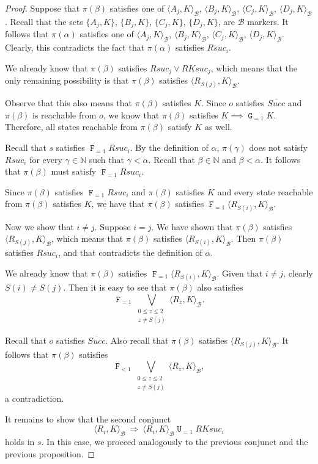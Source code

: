 \documentclass[a4paper,UKenglish,cleveref, autoref, thm-restate]{lipics-v2021}
\newcommand{\B}{\mathcal{B}}
\newcommand{\ex}[1]{\langle #1 \rangle}
\newcommand{\Succ}{\mathit{Succ}}
\newcommand{\RKSuc}{\textit{RKsuc}}
\newcommand*{\opu}{\operatorname{\pmb{\mathtt{U}}}}
\newcommand*{\opf}{\operatorname{\pmb{\mathtt{F}}}}
\newcommand*{\opg}{\operatorname{\pmb{\mathtt{G}}}}
\newcommand*{\nat}{\mathbb{N}}
\begin{document}
\begin{proof}
Suppose that $\pi(\beta)$ satisfies one of $\ex{A_j,K}_{\B}$,
$\ex{B_j,K}_{\B}$, $\ex{C_j,K}_{\B}$, $\ex{D_j,K}_{\B}$.
Recall that the sets $\{A_j,K\}$, $\{B_j,K\}$, $\{C_j,K\}$,
$\{D_j,K\}$, are $\B$ markers.
It follows that $\pi(\alpha)$ satisfies one of
$\ex{A_j,K}_{\B}$, $\ex{B_j,K}_{\B}$, $\ex{C_j,K}_{\B}$,
$\ex{D_j,K}_{\B}$.
Clearly, this contradicts the fact that $\pi(\alpha)$ satisfies
$Rsuc_i$.


We already know that $\pi(\beta)$ satisfies $Rsuc_j \vee RKsuc_j$,
which means that the only remaining possibility is that $\pi(\beta)$
satisfies $\ex{R_{S(j)},K}_\B$.

Observe that this also means that $\pi(\beta)$ satisfies $K$.
Since $o$ satisfies $\overline{\Succ}$ and $\pi(\beta)$ is
reachable from $o$, we know that $\pi(\beta)$ satisfies 
$K \implies \opg_{=1} K$.
Therefore, all states reachable from $\pi(\beta)$ satisfy $K$
as well.


Recall that $s$ satisfies $\opf_{=1} Rsuc_i$.
By the definition of $\alpha$, $\pi(\gamma)$ does not satisfy
$Rsuc_i$ for every $\gamma \in \nat$ such that $\gamma < \alpha$.
Recall that $\beta \in \nat$ and $\beta < \alpha$.
It follows that $\pi(\beta)$ must satisfy $\opf_{=1} Rsuc_i$.


Since $\pi(\beta)$ satisfies $\opf_{=1} Rsuc_i$
and $\pi(\beta)$ satisfies $K$
and every state reachable from $\pi(\beta)$ satisfies $K$,
we have that $\pi(\beta)$ satisfies $\opf_{=1} \ex{R_{S(i)},K}_{\B}$.


Now we show that $i \neq j$.
Suppose $i=j$.
We have shown that $\pi(\beta)$ satisfies $\ex{R_{S(j)},K}_\B$,
which means that $\pi(\beta)$ satisfies $\ex{R_{S(i)},K}_\B$.
Then $\pi(\beta)$ satisfies $Rsuc_i$, and that contradicts
the definition of $\alpha$.


We already know that $\pi(\beta)$ satisfies
$\opf_{=1} \ex{R_{S(i)},K}_{\B}$.
Given that $i \neq j$, clearly $S(i) \neq S(j)$.
Then it is easy to see that $\pi(\beta)$ also satisfies
\[
\opf_{=1} \bigvee_{\substack{0 \leq z \leq 2 \\ z \neq S(j)}} \ex{R_{z},K}_\B.
\]

Recall that $o$ satisfies $\overline{\Succ}$.
Also recall that $\pi(\beta)$ satisfies $\ex{R_{S(j)},K}_\B$.
It follows that $\pi(\beta)$ satisfies
\[
\opf_{<1} \bigvee_{\substack{0 \leq z \leq 2 \\ z \neq S(j)}} \ex{R_{z},K}_\B,
\]
a contradiction.

It remains to show that the second conjunct
\[
\ex{R_i,K}_{\B} \ \Rightarrow \ \ex{R_i,K}_{\B} \opu_{=1} \RKSuc_i
\]
holds in $s$.
In this case, we proceed analogously to the previous conjunct and
the previous proposition.
\end{proof}
\end{document}
